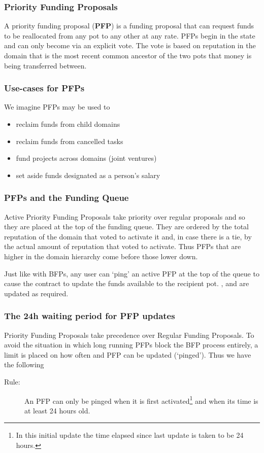 


\subsubsection{Priority Funding Proposals}
A priority funding proposal (\textbf{PFP}) is a funding proposal that can request funds to be reallocated from any pot to any other at any rate. PFPs begin in the  state and can only become  via an explicit vote. The vote is based on reputation in the domain that is the most recent common ancestor of the two pots that money is being transferred between.

\subsubsection*{Use-cases for PFPs}
We imagine PFPs may be used to
\begin{itemize}
 \item reclaim funds from child domains
 \item reclaim funds from cancelled tasks
 \item fund projects across domains (joint ventures)
 \item set aside funds designated as a person's salary
 \end{itemize}


\subsubsection*{PFPs and the Funding Queue}

Active Priority Funding Proposals take priority over regular proposals and so they are placed at the top of the funding queue. They are ordered by the total reputation of the domain that voted to activate it and, in case there is a tie, by the actual amount of reputation that voted to activate. Thus PFPs that are higher in the domain hierarchy come before those lower down.

Just like with BFPs, any user can `ping' an active PFP at the top of the queue to cause the contract to update the funds available to the recipient pot. ,  and  are updated as required.

\subsubsection*{The 24h waiting period for PFP updates}
Priority Funding Proposals take precedence over Regular Funding Proposals. To avoid the situation in which long running PFPs block the BFP process entirely, a limit is placed on how often and PFP can be updated (`pinged'). Thus we have the following
\begin{description}
 \item[Rule:] An PFP can only be pinged when it is first activated\footnote{In this initial update the time elapsed since last update is taken to be 24 hours.} and when its  time is at least 24 hours old.
\end{description}

